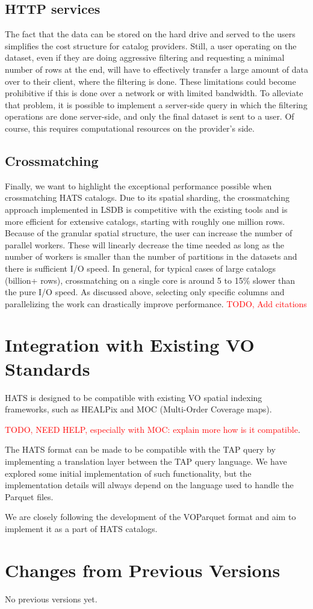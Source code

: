 \documentclass[11pt,a4paper]{ivoa}
\begin{document}
\subsection{HTTP services}
The fact that the data can be stored on the hard drive and served to the users simplifies the cost structure for catalog providers. 
Still, a user operating on the dataset, even if they are doing aggressive filtering and requesting a minimal number of rows at the end, will have to effectively transfer a large amount of data over to their client, where the filtering is done. 
These limitations could become prohibitive if this is done over a network or with limited bandwidth. To alleviate that problem, it is possible to implement a server-side query in which the filtering operations are done server-side, and only the final dataset is sent to a user. 
Of course, this requires computational resources on the provider's side.
\subsection{Crossmatching}
Finally, we want to highlight the exceptional performance possible when crossmatching HATS catalogs. 
Due to its spatial sharding, the crossmatching approach implemented in LSDB is competitive with the existing tools and is more efficient for extensive catalogs, starting with roughly one million rows. 
Because of the granular spatial structure, the user can increase the number of parallel workers. These will linearly decrease the time needed as long as the number of workers is smaller than the number of partitions in the datasets and there is sufficient I/O speed. 
In general, for typical cases of large catalogs (billion+ rows), crossmatching on a single core is around 5 to 15\% slower than the pure I/O speed. As discussed above, selecting only specific columns and parallelizing the work can drastically improve performance.   
\textcolor{red}{TODO, Add citations } 

    \section{Integration with Existing VO Standards}
    HATS is designed to be compatible with existing VO spatial indexing frameworks, such as HEALPix and MOC (Multi-Order Coverage maps). \par
   \textcolor{red}{TODO, NEED HELP, especially with MOC: explain more how is it compatible}. \par 
   The HATS format can be made to be compatible with the TAP query by implementing a translation layer between the TAP query language. We have explored some initial implementation of such functionality, but the implementation details will always depend on the language used to handle the Parquet files. \par
  We are closely following the development of the VOParquet format and aim to implement it as a part of HATS catalogs.


\appendix
\section{Changes from Previous Versions}
No previous versions yet.


\end{document}
